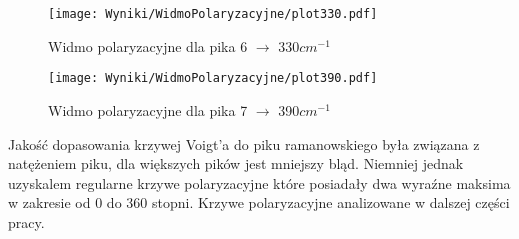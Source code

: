 \begin{figure}[H]
	\begin{center}
		\texttt{[image: Wyniki/WidmoPolaryzacyjne/plot330.pdf]}
		\caption{Widmo polaryzacyjne dla pika 6 $\rightarrow$ 330$cm^{-1}$ }
	\end{center}
\end{figure}

\begin{figure}[H]
	\begin{center}
		\texttt{[image: Wyniki/WidmoPolaryzacyjne/plot390.pdf]}
		\caption{Widmo polaryzacyjne dla pika 7 $\rightarrow$ 390$cm^{-1}$ }
	\end{center}
\end{figure}

Jakość dopasowania krzywej Voigt'a do piku ramanowskiego była związana z natężeniem piku, dla większych pików jest mniejszy bląd. Niemniej jednak uzyskalem regularne krzywe polaryzacyjne które posiadały dwa wyraźne maksima w zakresie od 0 do 360 stopni. Krzywe polaryzacyjne analizowane w dalszej części pracy.
